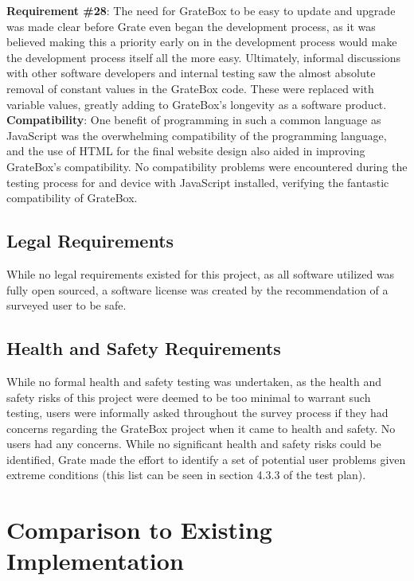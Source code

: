 \documentclass[12pt, titlepage]{article}
\begin{document}
\textbf{Requirement \#28}: The need for GrateBox to be easy to update and 
upgrade was made clear before Grate even began the development process, as it 
was believed making this a priority early on in the development process would 
make the development process itself all the more easy. Ultimately, informal 
discussions with other software developers and internal testing saw the almost 
absolute removal of constant values in the GrateBox code. These were replaced 
with variable values, greatly adding to GrateBox's longevity as a software 
product.\\

\textbf{Compatibility}: One benefit of programming in such a common language as 
JavaScript was the overwhelming compatibility of the programming language, and 
the use of HTML for the final website design also aided in improving GrateBox's 
compatibility. No compatibility problems were encountered during the testing 
process for and device with JavaScript installed, verifying the fantastic 
compatibility of GrateBox.

\subsection{Legal Requirements}

While no legal requirements existed for this project, as all software utilized 
was fully open sourced, a software license was created by the recommendation of 
a surveyed user to be safe.

\subsection{Health and Safety Requirements}

While no formal health and safety testing was undertaken, as the health and 
safety risks of this project were deemed to be too minimal to warrant such 
testing, users were informally asked throughout the survey process if they had 
concerns regarding the GrateBox project when it came to health and safety. No 
users had any concerns. While no significant health and safety risks could be 
identified, Grate made the effort to identify a set of potential user problems 
given extreme conditions (this list can be seen in section 4.3.3 of the test 
plan).

\section{Comparison to Existing Implementation}
\end{document}
